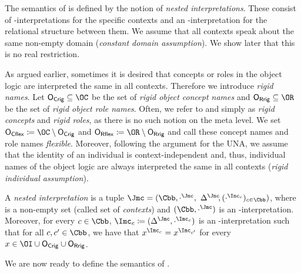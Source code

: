 The semantics of \LMLO is defined by the notion of \emph{nested interpretations}.  These consist of
\Osig-interpretations for the specific contexts and an \Msig-interpretation for the relational
structure between them.  We assume that all contexts speak about the same non-empty domain
(\emph{constant domain assumption}). We show later that this is no real restriction.

As argued earlier, sometimes it is desired that concepts or roles in the object logic are
interpreted the same in all contexts. Therefore we introduce \emph{rigid names}. Let
$\OCR\subseteq\OC$ be the set of \emph{rigid object concept names} and $\ORR\subseteq\OR$ be the set
of \emph{rigid object role names}.  Often, we refer to \OCR and \ORR simply as \emph{rigid concepts}
and \emph{rigid roles}, as there is no such notion on the meta level.  We set
$\OCF\coloneqq\OC\setminus\OCR$ and $\ORF\coloneqq\OR\setminus\ORR$ and call these concept names and
role names \emph{flexible}.  Moreover, following the argument for the UNA, we assume that the
identity of an individual is context-independent and, thus, individual names of the object logic are
always interpreted the same in all contexts (\emph{rigid individual assumption}).

\begin{definition}\label{def:nested-interpretation}
  A \emph{nested interpretation} is a tuple
  $\J=(\Cbb,\cdot^{\J},$ $\Delta^{\J}{\kern-0.2em},(\cdot^{\I_c})_{c\in\Cbb})$, where \Cbb is a
  non-empty set (called set of \emph{contexts}) and $(\Cbb,\cdot^\J)$ is an \Msig-inter\-pre\-ta\-tion.
  Moreover, for every $c\in\Cbb$, $\I_c\coloneqq(\Delta^{\J},\cdot^{\I_c})$ is an
  \Osig-interpretation such that for all $c,c'\in\Cbb$, we have that $x^{\I_{c}}=x^{\I_{c'}}$ for
  every $x\in\OI\cup\OCR\cup\ORR$.
\end{definition}

\noindent
We are now ready to define the semantics of \LMLO.

